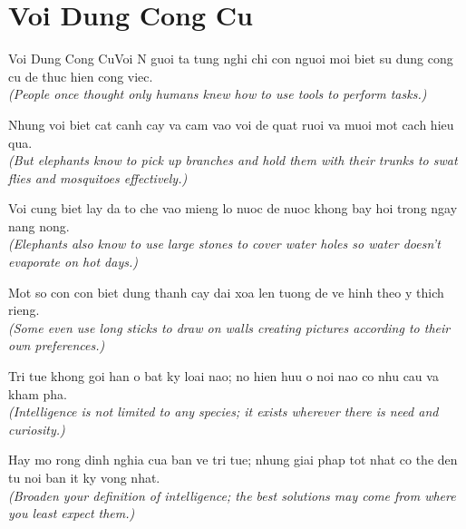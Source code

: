 \section{Voi Dung Cong Cu}
\begin{truyen}{Voi Dung Cong Cu}{Voi}
N guoi ta tung nghi chi con nguoi moi biet su dung cong cu de thuc hien cong viec.\\
\textit{(People once thought only humans knew how to use tools to perform tasks.)}

Nhung voi biet cat canh cay va cam vao voi de quat ruoi va muoi mot cach hieu qua.\\
\textit{(But elephants know to pick up branches and hold them with their trunks to swat flies and mosquitoes effectively.)}

Voi cung biet lay da to che vao mieng lo nuoc de nuoc khong bay hoi trong ngay nang nong.\\
\textit{(Elephants also know to use large stones to cover water holes so water doesn't evaporate on hot days.)}

Mot so con con biet dung thanh cay dai xoa len tuong de ve hinh theo y thich rieng.\\
\textit{(Some even use long sticks to draw on walls creating pictures according to their own preferences.)}

Tri tue khong goi han o bat ky loai nao; no hien huu o noi nao co nhu cau va kham pha.\\
\textit{(Intelligence is not limited to any species; it exists wherever there is need and curiosity.)}

\end{truyen}
\begin{baihoc}
  Hay mo rong dinh nghia cua ban ve tri tue; nhung giai phap tot nhat co the den tu noi ban it ky vong nhat.\\
  \textit{(Broaden your definition of intelligence; the best solutions may come from where you least expect them.)}
\end{baihoc}


